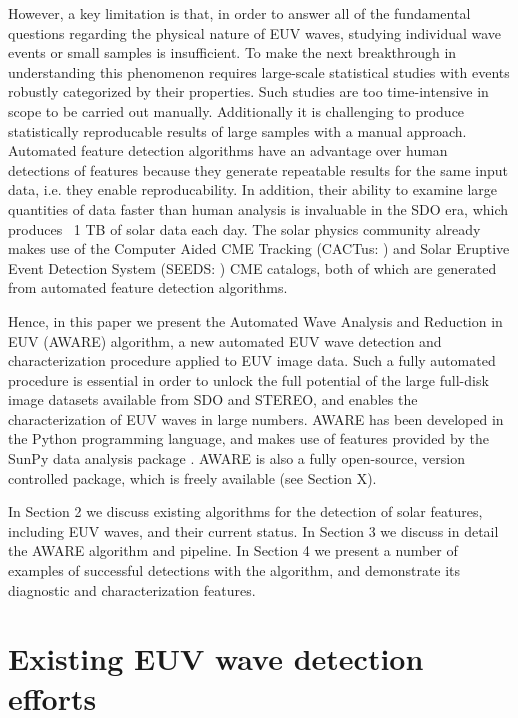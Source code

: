 \documentclass[namedreferences]{solarphysics}
\begin{document}
\begin{article}
However, a key limitation is that, in order to answer all of the
fundamental questions regarding the physical nature of EUV waves,
studying individual wave events or small samples is insufficient. To
make the next breakthrough in understanding this phenomenon requires
large-scale statistical studies with events robustly categorized by
their properties. Such studies are too time-intensive in scope to be
carried out manually. Additionally it is challenging to produce
statistically reproducable results of large samples with a manual
approach. Automated feature detection algorithms have an advantage
over human detections of features because they generate repeatable
results for the same input data, i.e. they enable reproducability. In
addition, their ability to examine large quantities of data faster
than human analysis is invaluable in the SDO era, which produces ~1 TB
of solar data each day. The solar physics community already makes use
of the Computer Aided CME Tracking (CACTus:
\cite{2004A&A...425.1097R}) and Solar Eruptive Event Detection System
(SEEDS: \cite{2008SoPh..248..485O}) CME catalogs, both of which are
generated from automated feature detection algorithms.

Hence, in this paper we present the Automated
Wave Analysis and Reduction in EUV (AWARE) algorithm, a new automated
EUV wave detection and characterization procedure applied to EUV image
data. Such a fully automated procedure is essential in order to unlock
the full potential of the large full-disk image datasets available
from SDO and STEREO, and enables the characterization of EUV waves in
large numbers. AWARE has been developed in the Python programming
language, and makes use of features provided by the SunPy data
analysis package \citep{mumford-proc-scipy-2013}. AWARE is also a
fully open-source, version controlled package, which is freely
available (see Section X).


In Section 2 we discuss existing algorithms for the detection of solar
features, including EUV waves, and their current status. In Section 3
we discuss in detail the AWARE algorithm and pipeline. In Section 4 we
present a number of examples of successful detections with the
algorithm, and demonstrate its diagnostic and characterization
features.

\section{Existing EUV wave detection efforts}\label{sec:existing}


\end{article}
\end{document}
